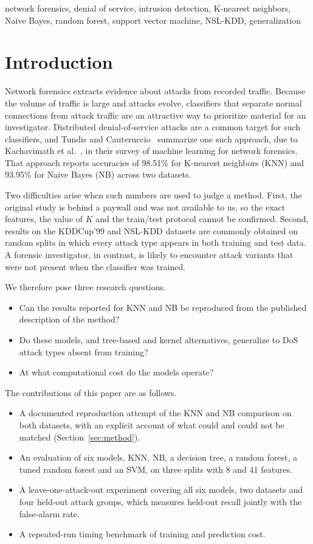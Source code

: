 \documentclass[conference]{IEEEtran}
\begin{document}
\begin{IEEEkeywords}
network forensics, denial of service, intrusion detection, K-nearest neighbors, Naive Bayes, random forest, support vector machine, NSL-KDD, generalization
\end{IEEEkeywords}

\section{Introduction}
Network forensics extracts evidence about attacks from recorded traffic. Because the volume of traffic is large and attacks evolve, classifiers that separate normal connections from attack traffic are an attractive way to prioritize material for an investigator. Distributed denial-of-service attacks are a common target for such classifiers, and Tundis and Cauteruccio~\cite{tundis2025} summarize one such approach, due to Kachavimath et al.~\cite{kachavimath2020}, in their survey of machine learning for network forensics. That approach reports accuracies of 98.51\% for K-nearest neighbors (KNN) and 93.95\% for Naive Bayes (NB) across two datasets.

Two difficulties arise when such numbers are used to judge a method. First, the original study is behind a paywall and was not available to us, so the exact features, the value of $K$ and the train/test protocol cannot be confirmed. Second, results on the KDDCup'99 and NSL-KDD datasets are commonly obtained on random splits in which every attack type appears in both training and test data. A forensic investigator, in contrast, is likely to encounter attack variants that were not present when the classifier was trained.

We therefore pose three research questions.
\begin{itemize}
  \item[\textbf{RQ1}] Can the results reported for KNN and NB be reproduced from the published description of the method?
  \item[\textbf{RQ2}] Do these models, and tree-based and kernel alternatives, generalize to DoS attack types absent from training?
  \item[\textbf{RQ3}] At what computational cost do the models operate?
\end{itemize}

The contributions of this paper are as follows.
\begin{itemize}
  \item A documented reproduction attempt of the KNN and NB comparison on both datasets, with an explicit account of what could and could not be matched (Section~\ref{sec:method}).
  \item An evaluation of six models, KNN, NB, a decision tree, a random forest, a tuned random forest and an SVM, on three splits with 8 and 41 features.
  \item A leave-one-attack-out experiment covering all six models, two datasets and four held-out attack groups, which measures held-out recall jointly with the false-alarm rate.
  \item A repeated-run timing benchmark of training and prediction cost.
\end{itemize}
\end{document}
